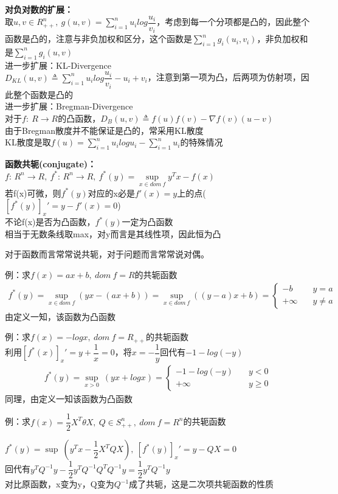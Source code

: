 \documentclass[11pt]{ctexart}         %
\newcommand{\rebacklinespread}[1][-12pt]{\vspace{#1}}
\newcommand{\oneline}[1][12pt]{\vspace{#1}}
\newcommand{\rs}[2][R]{#1^{#2}} %
\newcommand{\rl}[2][R]{#1_{#2}} %
\newcommand{\rls}[3][R]{#1_{#2}^{#3}} %
\newcommand{\ba}[1]{\begin{align*}#1\end{align*}}
\newcommand{\bc}[1]{\begin{cases}#1\end{cases}}
\newcommand{\li}[3][例]{
	#1：#2\\ 
	\phantom{#1：}\begin{minipage}[t]{0.9\linewidth}%
	\setlength\parskip{12pt}
	#3
	\end{minipage}
	\oneline}
\begin{document}
\textbf{对负对数的扩展：}\\
取$u,v\in \rls{++}{n},\ g(u,v)=\sum_{i=1}^{n}u_ilog\dfrac{u_i}{v_i}$，考虑到每一个分项都是凸的，因此整个函数是凸的，注意与非负加权和区分，这个函数是$\sum_{i=1}^{n}g_i(u_i,v_i)$，非负加权和是$\sum_{i=1}^{n}g_i(u,v)$\\[8pt]
进一步扩展：KL-Divergence\\
$D_{KL}(u,v)\triangleq \sum_{i=1}^{n}u_ilog\dfrac{u_i}{v_i}-u_i+v_i$，注意到第一项为凸，后两项为仿射项，因此整个函数是凸的\\[8pt]
进一步扩展：Bregman-Divergence\\
对于$f:\ R\to R$的凸函数，$D_B(u,v)\triangleq f(u)f(v)-\nabla f(v)(u-v)$\\
由于Bregman散度并不能保证是凸的，常采用KL散度\\
KL散度是取$f(u)=\sum_{i=1}^{n}u_ilogu_i-\sum_{i=1}^nu_i$的特殊情况

\pagebreak
\textbf{函数共轭(conjugate)：}\\
$f:\,\rs{n}\to R,\ f^*:\,\rs{n}\to R,\ f^*(y)=\sup\limits_{x\in dom\ f}y^Tx-f(x)$\\ [8pt]
若f(x)可微，则$f^*(y)$对应的x必是$f'(x)=y$上的点($[f^*(y)]_x'=y-f'(x)=0$)\\
不论f(x)是否为凸函数，$f^*(y)$一定为凸函数\\
相当于无数条线取max，对y而言是其线性项，因此恒为凸

对于函数而言常常说共轭，对于问题而言常常说对偶。

例：求$f(x)=ax+b,\ dom\ f=R$的共轭函数
\rebacklinespread
\ba{f^*(y)=\sup\limits_{x\in dom\ f}(yx-(ax+b))=\sup\limits_{x\in dom\ f}((y-a)x+b)=\bc{-b\quad & y=a\\ +\infty \quad &y\neq a}}
\phantom{例：}由定义一知，该函数为凸函数

例：求$f(x)=-logx,\ dom\ f=\rl{++}$的共轭函数\\
\phantom{例：}利用$[f^*(x)]_x'=y+\dfrac{1}{x}=0$，将$x=-\dfrac{1}{y}$回代有$-1-log(-y)$
\rebacklinespread
\ba{f^*(y)=\sup\limits_{x>0}\ (yx+logx)=\bc{-1-log(-y)\quad&y<0\\+\infty \quad&y\geq 0}}
\phantom{例：}同理，由定义一知该函数为凸函数

\li{求$f(x)=\dfrac{1}{2}X^T\theta X,\ Q\in\rls[S]{++}{n},\ dom\ f=\rs{n}$的共轭函数}{$f^*(y)=\sup\ (y^Tx-\dfrac{1}{2}X^TQX),\ [f^*(y)]_x'=y-	QX=0$\\ [8pt]
回代有$y^TQ^{-1}y-\dfrac{1}{2}y^TQ^{-1}Q^TQ^{-1}y=\dfrac{1}{2}y^TQ^{-1}y$\\ [8pt]
对比原函数，x变为y，Q变为$Q^{-1}$成了共轭，这是二次项共轭函数的性质}
\end{document}
